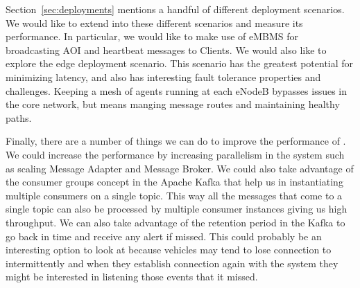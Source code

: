 Section~\ref{sec:deployments} mentions a handful of different
deployment scenarios. We would like to extend \name{} into these
different scenarios and measure its performance. In particular,
we would like to make use of eMBMS for broadcasting AOI and
heartbeat messages to Clients.  We would also like to explore
the edge deployment scenario. This scenario has the greatest
potential for minimizing latency, and also has interesting fault
tolerance properties and challenges. Keeping a mesh of agents
running at each eNodeB bypasses issues in the core network, but
means manging message routes and maintaining healthy paths.

Finally, there are a number of things we can do to improve the
performance of \name. We could increase the performance by increasing
parallelism in the system such as scaling Message Adapter and Message
Broker. We could also take advantage of the consumer groups concept in
the Apache Kafka that help us in instantiating multiple consumers on a
single topic. This way all the messages that come to a single topic
can also be processed by multiple consumer instances giving us high
throughput. We can also take advantage of the retention period in the
Kafka to go back in time and receive any alert if missed. This could
probably be an interesting option to look at because vehicles may tend
to lose connection to intermittently and when they establish
connection again with the system they might be interested in listening
those events that it missed.

